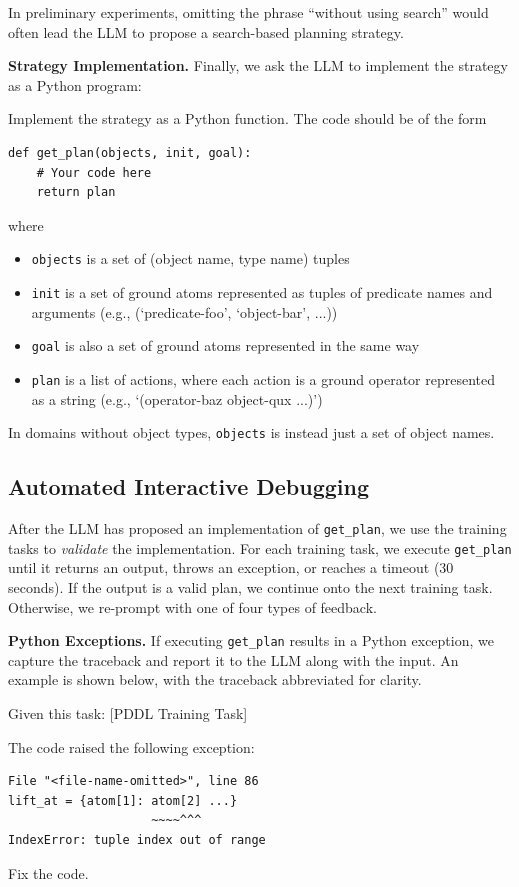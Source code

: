 \documentclass[letterpaper]{article} %
\begin{document}
In preliminary experiments, omitting the phrase ``without using search'' would often lead the LLM to propose a search-based planning strategy.

\textbf{Strategy Implementation.}
Finally, we ask the LLM to implement the strategy as a Python program:

\begin{tcolorbox}[left=2pt,right=2pt]
\footnotesize
Implement the strategy as a Python function. The code should be of the form

\begin{verbatim}
def get_plan(objects, init, goal):
    # Your code here
    return plan
\end{verbatim}

where
\begin{itemize}
    \item \texttt{objects} is a set of (object name, type name) tuples
    \item \texttt{init} is a set of ground atoms represented as tuples of predicate names and arguments (e.g., (`predicate-foo', `object-bar', ...))
    \item \texttt{goal} is also a set of ground atoms represented in the same way
    \item \texttt{plan} is a list of actions, where each action is a ground operator represented as a string (e.g., `(operator-baz object-qux ...)')
\end{itemize}
\end{tcolorbox}

In domains without object types, \texttt{objects} is instead just a set of object names.

\subsection{Automated Interactive Debugging}

After the LLM has proposed an implementation of \texttt{get\_plan}, we use the training tasks to \emph{validate} the implementation.
For each training task, we execute \texttt{get\_plan} until it returns an output, throws an exception, or reaches a timeout (30 seconds).
If the output is a valid plan, we continue onto the next training task.
Otherwise, we re-prompt with one of four types of feedback.

\textbf{Python Exceptions.} If executing \texttt{get\_plan} results in a Python exception, we capture the traceback and report it to the LLM along with the input.
An example is shown below, with the traceback abbreviated for clarity.
\begin{tcolorbox}[left=2pt,right=2pt]
Given this task: [PDDL Training Task]

The code raised the following exception:
\begin{verbatim}
File "<file-name-omitted>", line 86
lift_at = {atom[1]: atom[2] ...}
                    ~~~~^^^
IndexError: tuple index out of range
\end{verbatim}

Fix the code.
\end{tcolorbox}
\end{document}
